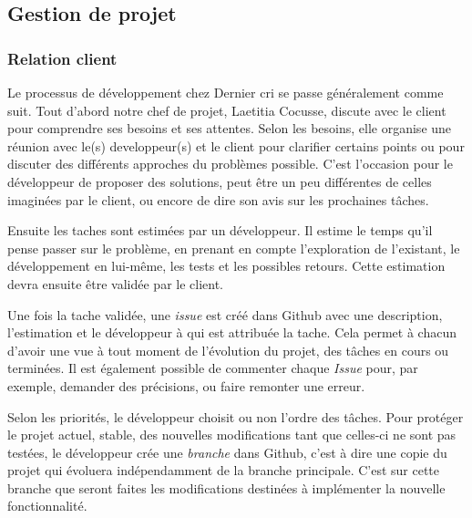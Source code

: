 \documentclass[12pt,a4paper]{article}
\begin{document}
  \subsection{Gestion de projet}\label{gestion-de-projet}

  \subsubsection{Relation client}\label{relation-client}

  \bigskip

  Le processus de développement chez Dernier cri se passe généralement
  comme suit. Tout d'abord notre chef de projet, Laetitia Cocusse, discute
  avec le client pour comprendre ses besoins et ses attentes. Selon les
  besoins, elle organise une réunion avec le(s) developpeur(s) et le
  client pour clarifier certains points ou pour discuter des différents
  approches du problèmes possible. C'est l'occasion pour le développeur de
  proposer des solutions, peut être un peu différentes de celles imaginées
  par le client, ou encore de dire son avis sur les prochaines tâches.

  \bigskip

  Ensuite les taches sont estimées par un développeur. Il estime le temps
  qu'il pense passer sur le problème, en prenant en compte l'exploration
  de l'existant, le développement en lui-même, les tests et les possibles
  retours. Cette estimation devra ensuite être validée par le client.

  \bigskip

  Une fois la tache validée, une \emph{issue} est créé dans Github avec
  une description, l'estimation et le développeur à qui est attribuée la
  tache. Cela permet à chacun d'avoir une vue à tout moment de l'évolution
  du projet, des tâches en cours ou terminées. Il est également possible
  de commenter chaque \emph{Issue} pour, par exemple, demander des
  précisions, ou faire remonter une erreur.

  \bigskip

  Selon les priorités, le développeur choisit ou non l'ordre des tâches.
  Pour protéger le projet actuel, stable, des nouvelles modifications tant
  que celles-ci ne sont pas testées, le développeur crée une
  \emph{branche} dans Github, c'est à dire une copie du projet qui
  évoluera indépendamment de la branche principale. C'est sur cette
  branche que seront faites les modifications destinées à implémenter la
  nouvelle fonctionnalité.
\end{document}
